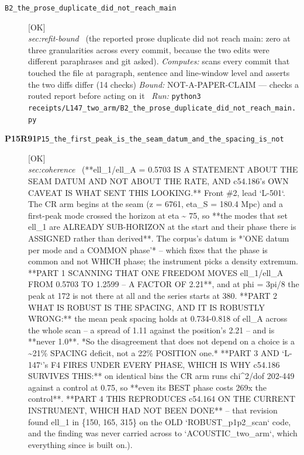 \begin{description}
\item[\label{rcpt:B2_the_prose_duplicate_did_not_reach_main}\textbf{}\quad\texttt{B2\_the\_prose\_duplicate\_did\_not\_reach\_main}]\hfill\textsf{[OK]}\\
\textit{sec:refit-bound} \ (the reported prose duplicate did not reach main: zero at three granularities across every commit, because the two edits were different paraphrases and git asked). 
\emph{Computes:} scans every commit that touched the file at paragraph, sentence and line-window level and asserts the two diffs differ (14 checks)
 \emph{Bound:} NOT-A-PAPER-CLAIM --- checks a routed report before acting on it
\ \emph{Run:} \texttt{python3 receipts/L147\_two\_arm/B2\_the\_prose\_duplicate\_did\_not\_reach\_main.py}
\item[\textbf{P15R91}\quad\texttt{P15\_the\_first\_peak\_is\_the\_seam\_datum\_and\_the\_spacing\_is\_not}]\hfill\textsf{[OK]}\\
\textit{sec:coherence} \ (**ell\_1/ell\_A = 0.5703 IS A STATEMENT ABOUT THE SEAM DATUM AND NOT ABOUT THE RATE, AND c54.186's OWN CAVEAT IS WHAT SENT THIS LOOKING.** Front \#2, lead `L-501`. The CR arm begins at the seam (z = 6761, eta\_S = 180.4 Mpc) and a first-peak mode crossed the horizon at eta \textasciitilde{} 75, so **the modes that set ell\_1 are ALREADY SUB-HORIZON at the start and their phase there is ASSIGNED rather than derived**. The corpus's datum is *'ONE datum per mode and a COMMON phase'* -- which fixes that the phase is common and not WHICH phase; the instrument picks a density extremum. **PART 1 SCANNING THAT ONE FREEDOM MOVES ell\_1/ell\_A FROM 0.5703 TO 1.2599 -- A FACTOR OF 2.21**, and at phi = 3pi/8 the peak at 172 is not there at all and the series starts at 380. **PART 2 WHAT IS ROBUST IS THE SPACING, AND IT IS ROBUSTLY WRONG:** the mean peak spacing holds at 0.734-0.818 of ell\_A across the whole scan -- a spread of 1.11 against the position's 2.21 -- and is **never 1.0**. *So the disagreement that does not depend on a choice is a \textasciitilde{}21\% SPACING deficit, not a 22\% POSITION one.* **PART 3 AND `L-147`'s F4 FIRES UNDER EVERY PHASE, WHICH IS WHY c54.186 SURVIVES THIS:** on identical bins the CR arm runs chi\textasciicircum{}2/dof 202-449 against a control at 0.75, so **even its BEST phase costs 269x the control**. **PART 4 THIS REPRODUCES c54.164 ON THE CURRENT INSTRUMENT, WHICH HAD NOT BEEN DONE** -- that revision found ell\_1 in \{150, 165, 315\} on the OLD `ROBUST\_p1p2\_scan` code, and the finding was never carried across to `ACOUSTIC\_two\_arm`, which everything since is built on.). 

\end{description}
